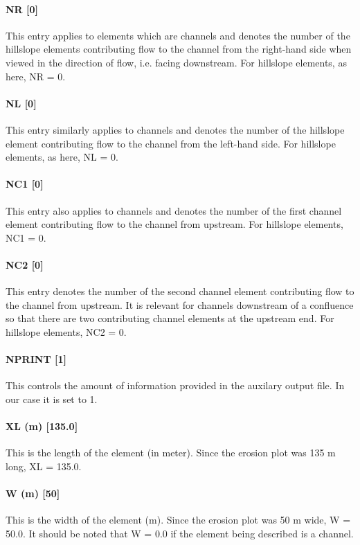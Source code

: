 \paragraph{NR [0]}
This entry applies to elements which are channels and denotes the number of the
hillslope elements contributing flow to the channel from the right-hand side
when viewed in the direction of flow, i.e. facing downstream. For hillslope
elements, as here, NR = 0.
 
\paragraph{NL [0]}
This entry similarly applies to channels and denotes the number of the
hillslope element contributing flow to the channel from the left-hand side. For
hillslope elements, as here, NL = 0.
 
\paragraph{NC1 [0]}
This entry also applies to channels and denotes the number of the first channel
element contributing flow to the channel from upstream. For hillslope elements,
NC1 = 0.
 
\paragraph{NC2 [0]}
This entry denotes the number of the second channel element contributing flow
to the channel from upstream. It is relevant for channels downstream of a
confluence so that there are two contributing channel elements at the upstream
end. For hillslope elements, NC2 = 0.
 
\paragraph{NPRINT [1]}
This controls the amount of information provided in the auxilary output file.
In our case it is set to 1.
 
\paragraph{XL (m) [135.0]}
This is the length of the element (in meter). Since the erosion plot was 135 m
long, XL = 135.0.
 
\paragraph{W (m) [50]}
This is the width of the element (m). Since the erosion plot was 50 m wide, W =
50.0. It should be noted that W = 0.0 if the element being described is a
channel.
 
